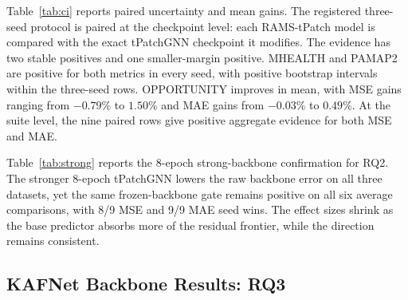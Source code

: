 ﻿\documentclass[10pt,conference]{IEEEtran}
\newcommand{\method}{\textnormal{\mbox{RAMS}}}
\newcommand{\tpatchinst}{\textnormal{\mbox{RAMS-tPatch}}}
\newcommand{\baseT}{\textnormal{\mbox{tPatchGNN}}}
\newcommand{\baseK}{\textnormal{\mbox{KAFNet}}}
\begin{document}
Table~\ref{tab:ci} reports paired uncertainty and mean gains.  The
registered three-seed protocol is paired at the checkpoint level: each
\tpatchinst{} model is compared with the exact \baseT{} checkpoint it modifies.
The evidence
has two stable positives and one smaller-margin positive.  MHEALTH and PAMAP2
are positive for both metrics in every seed, with positive bootstrap intervals
within the three-seed rows.  OPPORTUNITY improves in mean, with MSE gains
ranging from \(-0.79\%\) to \(1.50\%\) and MAE gains from \(-0.03\%\) to
\(0.49\%\).  At the suite level, the nine paired rows give positive aggregate
evidence for both MSE and MAE.

\begin{table}[H]
\centering
\caption{\tpatchinst{} 8-epoch strong-backbone confirmation.  Entries show
paired base-to-\method{} values, gain percentages, and seed wins.}
\label{tab:strong}
\footnotesize
{}
\end{table}

Table~\ref{tab:strong} reports the 8-epoch strong-backbone confirmation for
RQ2.  The stronger 8-epoch \baseT{} lowers the raw
backbone error on all three datasets, yet the same frozen-backbone gate remains
positive on all six average comparisons, with 8/9 MSE and 9/9 MAE seed wins.
The effect sizes shrink as the base predictor absorbs more of the residual
frontier, while the direction remains consistent.

\subsection{\baseK{} Backbone Results: RQ3}
\end{document}
